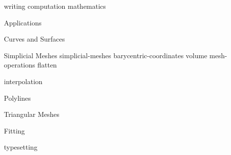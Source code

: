 \def\sharedFolder{../shared/}
{writing}
{computation}
{mathematics}
\begin{plSection}{Applications}
\begin{plSection}{Curves and Surfaces}
\begin{plSection}{Simplicial Meshes}
{simplicial-meshes}
{barycentric-coordinates}
{volume}
{mesh-operations}
{flatten}
\end{plSection}%
{interpolation}
\begin{plSection}{Polylines}
\end{plSection}%
\begin{plSection}{Triangular Meshes}
\end{plSection}%
\begin{plSection}{Fitting}
\end{plSection} %
\end{plSection} %
\end{plSection}%
\BeginAppendices
{typesetting}
